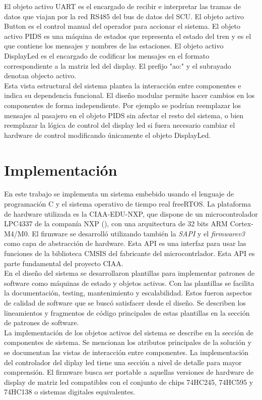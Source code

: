 El objeto activo UART es el encargado de recibir e interpretar las tramas de datos que viajan por la red RS485 del bus de datos del SCU. El objeto activo Button es el control manual del operador para accionar el sistema. El objeto activo PIDS es una máquina de estados que representa el estado del tren y es el que contiene los mensajes y nombres de las estaciones. El objeto activo DisplayLed es el encargado de codificar los mensajes en el formato correspondiente a la matriz led del display. El prefijo "ao:" y el subrayado denotan objecto activo.\\

Esta vista estructural del sistema plantea la interacción entre componentes e indica su dependencia funcional. El diseño modular permite hacer cambios en los componentes de forma independiente. Por ejemplo se podrían reemplazar los mensajes al pasajero en el objeto PIDS sin afectar el resto del sistema, o bien reemplazar la lógica de control del display led si fuera necesario cambiar el hardware de control modificando únicamente el objeto DisplayLed.\\


\section{Implementación}
En este trabajo se implementa un sistema embebido usando el lenguaje de programación C y el sistema operativo de tiempo real freeRTOS. La plataforma de hardware utilizada es la CIAA-EDU-NXP, que dispone de un microcontrolador LPC4337 de la companía NXP (\citep{NXPLPC4337}), con una arquitectura de 32 bits ARM Cortex-M4/M0. El firmware se desarrolló utilizando también la \textit{SAPI} y el \textit{firmwarev3} \citep{firmwarev3} como capa de abstracción de hardware. Esta API es una interfaz para usar las funciones de la biblioteca CMSIS del fabricante del microcontrlador. Esta API es parte fundamental del proyecto CIAA.\\
 
En el diseño del sistema se desarrollaron plantillas para implementar patrones de software como máquinas de estado y objetos activos. Con las plantillas se facilita la documentación, testing, mantenimiento y escalabilidad. Estos fueron aspectos de calidad de software que se buscó satisfacer desde el diseño. Se describen los lineamientos y fragmentos de código principales de estas plantillas en la sección de patrones de software. \\

La implementación de los objetos activos del sistema se describe en la sección de componentes de sistema. Se mencionan los atributos principales de la solución y se documentan las vistas de interacción entre componentes. La implementación del controlador del diplay led tiene una sección a nivel de detalle para mayor comprensión. El firmware busca ser portable a aquellas versiones de hardware de display de matriz led compatibles con el conjunto de chips 74HC245, 74HC595 y 74HC138 o sistemas digitales equivalentes. \\



